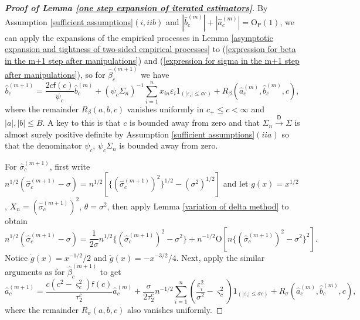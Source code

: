 \documentclass[11pt, letterpaper]{article}
\numberwithin{algorithm}{section}
\numberwithin{assumption}{section}
\numberwithin{lemma}{section}
\numberwithin{theorem}{section}
\numberwithin{corollary}{section}
\numberwithin{remark}{section}
\numberwithin{equation}{section}
\numberwithin{figure}{section}
\numberwithin{table}{section}
\begin{document}
\begin{proof}[\textnormal{\textbf{Proof of Lemma \ref{one step expansion of iterated estimators}}}]
By Assumption \ref{sufficient assumptions}$(i, iib)$ and $|\widehat{b}_{c}^{(m)}| + |\widehat{a}_{c}^{(m)}| = \mathrm{O}_{\mathsf{P}}(1)$, we can apply the expansions of the empirical processes in Lemma \ref{asymptotic expansion and tightness of two-sided empirical processes} to (\ref{expression for beta in the m+1 step after manipulations}) and (\ref{expression for sigma in the m+1 step after manipulations}), so for $\widehat{\beta}_{c}^{(m + 1)}$ we have
\begin{equation*}
\widehat{b}_{c}^{(m+1)} = \frac{2c \mathsf{f}(c)}{\psi_{c}} \widehat{b}_{c}^{(m)} + (\psi_{c} \Sigma_{n})^{-1} \sum_{i=1}^{n} x_{in} \varepsilon_{i} 1_{(|\varepsilon_{i}| \le \sigma c)} + R_{\beta}(\widehat{a}_{c}^{(m)}, \widehat{b}_{c}^{(m)}, c),
\end{equation*}
where the remainder $R_{\beta}(a, b, c)$ vanishes uniformly in $c_{+} \le c < \infty$ and $|a|, |b| \le B$. A key to this is that $c$ is bounded away from zero and that $\Sigma_{n} \overset{\mathsf{D}}{\to} \Sigma$ is almost surely positive definite by Assumption \ref{sufficient assumptions}$(iia)$ so that the denominator $\psi_{c}$, $\psi_{c} \Sigma_{n}$ is bounded away from zero.

For $\widehat{\sigma}_{c}^{(m+1)}$, first write $n^{1/2} (\widehat{\sigma}_{c}^{(m + 1)} - \sigma) = n^{1/2} [ \{ (\widehat{\sigma}_{c}^{(m + 1)})^{2} \}^{1/2} - (\sigma^{2})^{1/2} ]$ and let $g(x) = x^{1/2}$, $X_{n} = (\widehat{\sigma}_{c}^{(m + 1)})^{2}$, $\theta = \sigma^{2}$, then apply Lemma \ref{variation of delta method} to obtain
\begin{equation*}
n^{1/2}(\widehat{\sigma}_{c}^{(m+1)} - \sigma) = \frac{1}{2 \sigma} n^{1/2} \{ (\widehat{\sigma}_{c}^{(m+1)})^{2} - \sigma^{2} \} + n^{-1/2} \mathrm{O}[ n \{ (\widehat{\sigma}_{c}^{(m+1)})^{2} - \sigma^{2} \}^{2} ].
\end{equation*}
Notice $\dot{g}(x) = x^{-1/2} / 2$ and $\ddot{g}(x) = - x^{-3/2} / 4$. Next, apply the similar arguments as for $\widehat{\beta}_{c}^{(m + 1)}$ to get
\begin{equation*}
\widehat{a}_{c}^{(m+1)} = \frac{c(c^{2} - \varsigma_{c}^{2})\mathsf{f}(c)}{\tau_{2}^{c}}\widehat{a}_{c}^{(m)} + \frac{\sigma}{2 \tau_{2}^{c}} n^{-1/2}  \sum_{i=1}^{n} (\frac{\varepsilon_{i}^{2}}{\sigma^{2}} - \varsigma_{c}^{2}) 1_{(|\varepsilon_{i}| \le \sigma c)} + R_{\sigma}(\widehat{a}_{c}^{(m)}, \widehat{b}_{c}^{(m)}, c),
\end{equation*}
where the remainder $R_{\sigma}(a, b, c)$ also vanishes uniformly.
\end{proof}
\end{document}
